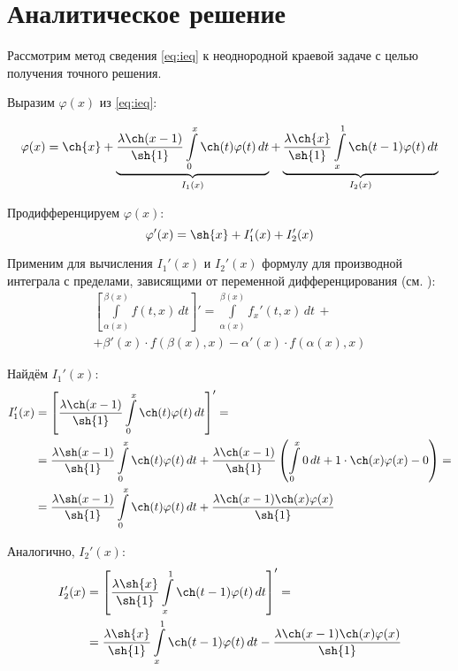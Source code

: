 \documentclass[11pt]{article}
\numberwithin{equation}{section}
\renewcommand{\phi}{\varphi}
\newcommand{\intl}{\int\limits}
\begin{document}
\clearpage
\section{Аналитическое решение}
\label{sec:anal-solution}

Рассмотрим метод сведения \eqref{eq:ieq} к неоднородной краевой задаче
с целью получения точного решения.

Выразим $\phi(x)$ из \eqref{eq:ieq}:

\begin{equation}
  \label{eq:phi}
  \phi(x) = \ch{x} + 
  \underbrace{\frac{\lambda \ch(x-1)}{\sh{1}}\intl_0^x{\ch(t) \phi(t)\,dt}}_{I_1(x)} +
  \underbrace{\frac{\lambda \ch{x}}{\sh{1}}\intl_x^1{\ch(t-1)\phi(t)\,dt}}_{I_2(x)}
\end{equation}

Продифференцируем $\phi(x)$:
\begin{equation*}
  \phi'(x) = \sh{x} + I_1'(x) + I_2'(x)
\end{equation*}

Применим для вычисления $I_1'(x)$ и $I_2'(x)$ формулу для производной
интеграла с пределами, зависящими от переменной дифференцирования (см.
\cite{fikhtengolz03}):
\begin{multline}\label{eq:intdiff}
  \left [ \intl_{\alpha(x)}^{\beta(x)}{f(t, x)\,dt} \right ] ' = 
  \intl_{\alpha(x)}^{\beta(x)}{{f_x}'(t, x)\,dt}\, + \\
  + \beta'(x)\cdot f(\beta(x), x) -
  \alpha'(x)\cdot f(\alpha(x), x)
\end{multline}

Найдём $I_1'(x)$:
\begin{align*}
  I_1'(x) &= \left[ \frac{\lambda \ch(x-1)}{\sh{1}}\intl_0^x{\ch(t) \phi(t)\,dt} \right] ' = \\
  &= \frac{\lambda \sh(x-1)}{\sh{1}}\intl_0^x{\ch(t)\phi(t)\,dt} +
  \frac{\lambda \ch(x-1)}{\sh{1}} \left ( \intl_0^x{0\,dt} +
    1 \cdot \ch(x) \phi(x) - 0 \right) = \\
  &= \frac{\lambda \sh(x-1)}{\sh{1}}\intl_0^x{\ch(t)\phi(t)\,dt} +
  \frac{\lambda \ch(x-1) \ch(x) \phi(x)}{\sh{1}}    
\end{align*}

Аналогично, $I_2'(x)$:
\begin{align*}
  I_2'(x) &= \left[\frac{\lambda \sh{x}}{\sh{1}}\intl_x^1{\ch(t-1)\phi(t)\,dt} \right] ' = \\
  &= \frac{\lambda \sh{x}}{\sh{1}}\intl_x^1{\ch(t-1)\phi(t)\,dt} -
  \frac{\lambda \ch(x-1) \ch(x) \phi(x)}{\sh{1}}
\end{align*}
\end{document}
